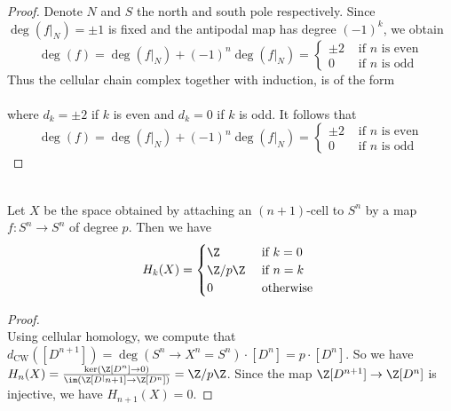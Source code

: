 \documentclass[a4paper]{article}
\begin{document}
\begin{eg}{}{}
\begin{proof}
Denote $N$ and $S$ the north and south pole respectively. Since $\deg(f|_N)=\pm 1$ is fixed and the antipodal map has degree $(-1)^k$, we obtain $$\deg(f)=\deg(f|_N)+(-1)^n\deg(f|_N)=\begin{cases}
\pm2 & \text{ if } n \text{ is even}\\
0 & \text{ if } n \text{ is odd}
\end{cases}$$ Thus the cellular chain complex together with induction, is of the form \\
\\
where $d_k=\pm2$ if $k$ is even and $d_k=0$ if $k$ is odd. It follows that $$\deg(f)=\deg(f|_N)+(-1)^n\deg(f|_N)=\begin{cases}
\pm2 & \text{ if } n \text{ is even}\\
0 & \text{ if } n \text{ is odd}
\end{cases}$$
\end{proof}
\end{eg}

\begin{eg}{}{}\\
Let $X$ be the space obtained by attaching an $(n+1)$-cell to $S^n$ by a map $f:S^n\to S^n$ of degree $p$. Then we have $$H_k(X)=\begin{cases}
\Z & \text{ if }k=0\\
\Z/p\Z & \text{ if }n=k\\
0 & \text{ otherwise }
\end{cases}$$
\begin{proof}\\
Using cellular homology, we compute that $d_\text{CW}([D^{n+1}])=\deg(S^n\to X^n=S^n)\cdot[D^n]=p\cdot[D^n]$. So we have $H_n(X)=\frac{\ker(\Z[D^n]\to 0)}{\im(\Z[D^[n+1]\to\Z[D^n])}=\Z/p\Z$. Since the map $\Z[D^{n+1}]\to\Z[D^n]$ is injective, we have $H_{n+1}(X)=0$. 
\end{proof}
\end{eg}
\end{document}
